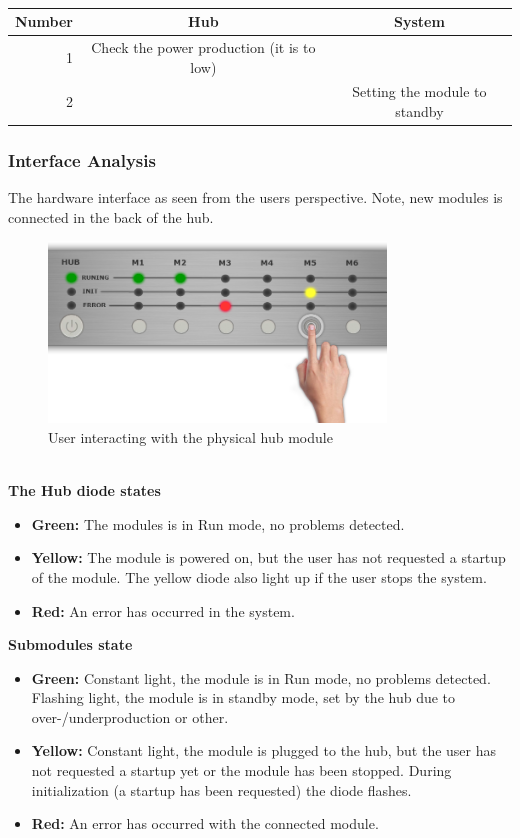 		\\\begin{table}[h!]
					\begin{tabular}{| r | c | c |}
					\hline
					Number	& Hub				& System \\ \hline
					1		& Check the power production (it is to low)	& ~ \\ \hline
					2		& ~											& Setting the module to standby \\ \hline
					\end{tabular}
				\end{table}
	\newpage	
	\subsubsection{Interface Analysis}
	The hardware interface as seen from the users perspective. Note, new modules is connected in the back of the hub.
		\begin{figure}[h!]		%
			\begin{centering}
				 \includegraphics[width=0.8\textwidth]{images/hub_user_interact.png}
				\caption{User interacting with the physical hub module}
		 	\end{centering}
		\end{figure}
		\\ \textbf{The Hub diode states}
		\begin{itemize}
			\item \textbf{Green: }The modules is in Run mode, no problems detected.
			\item \textbf{Yellow: }The module is powered on, but the user has not requested a startup of the module.
							The yellow diode also light up if the user stops the system.
			\item \textbf{Red: }An error has occurred in the system.
		\end{itemize}
		\textbf{Submodules state}
		\begin{itemize}
			\item \textbf{Green: }Constant light, the module is in Run mode, no problems detected. Flashing light, the module is in standby mode, set by the hub
							due to over-/underproduction or other.
			\item \textbf{Yellow: }Constant light, the module is plugged to the hub, but the user has not requested a startup yet or the module has been stopped.
							During initialization (a startup has been requested) the diode flashes.
			\item \textbf{Red: }An error has occurred with the connected module.
		\end{itemize}

